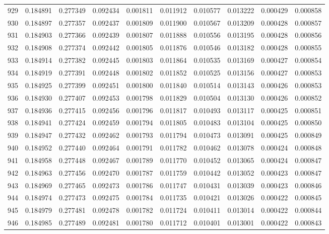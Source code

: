 \begin{tabular}{lrrrrrrrrr}
929 & 0.184891 & 0.277349 & 0.092434 & 0.001811 & 0.011912 & 0.010577 & 0.013222 & 0.000429 & 0.000858 \\
930 & 0.184897 & 0.277357 & 0.092437 & 0.001809 & 0.011900 & 0.010567 & 0.013209 & 0.000428 & 0.000857 \\
931 & 0.184903 & 0.277366 & 0.092439 & 0.001807 & 0.011888 & 0.010556 & 0.013195 & 0.000428 & 0.000856 \\
932 & 0.184908 & 0.277374 & 0.092442 & 0.001805 & 0.011876 & 0.010546 & 0.013182 & 0.000428 & 0.000855 \\
933 & 0.184914 & 0.277382 & 0.092445 & 0.001803 & 0.011864 & 0.010535 & 0.013169 & 0.000427 & 0.000854 \\
934 & 0.184919 & 0.277391 & 0.092448 & 0.001802 & 0.011852 & 0.010525 & 0.013156 & 0.000427 & 0.000853 \\
935 & 0.184925 & 0.277399 & 0.092451 & 0.001800 & 0.011840 & 0.010514 & 0.013143 & 0.000426 & 0.000853 \\
936 & 0.184930 & 0.277407 & 0.092453 & 0.001798 & 0.011829 & 0.010504 & 0.013130 & 0.000426 & 0.000852 \\
937 & 0.184936 & 0.277415 & 0.092456 & 0.001796 & 0.011817 & 0.010493 & 0.013117 & 0.000425 & 0.000851 \\
938 & 0.184941 & 0.277424 & 0.092459 & 0.001794 & 0.011805 & 0.010483 & 0.013104 & 0.000425 & 0.000850 \\
939 & 0.184947 & 0.277432 & 0.092462 & 0.001793 & 0.011794 & 0.010473 & 0.013091 & 0.000425 & 0.000849 \\
940 & 0.184952 & 0.277440 & 0.092464 & 0.001791 & 0.011782 & 0.010462 & 0.013078 & 0.000424 & 0.000848 \\
941 & 0.184958 & 0.277448 & 0.092467 & 0.001789 & 0.011770 & 0.010452 & 0.013065 & 0.000424 & 0.000847 \\
942 & 0.184963 & 0.277456 & 0.092470 & 0.001787 & 0.011759 & 0.010442 & 0.013052 & 0.000423 & 0.000847 \\
943 & 0.184969 & 0.277465 & 0.092473 & 0.001786 & 0.011747 & 0.010431 & 0.013039 & 0.000423 & 0.000846 \\
944 & 0.184974 & 0.277473 & 0.092475 & 0.001784 & 0.011735 & 0.010421 & 0.013026 & 0.000422 & 0.000845 \\
945 & 0.184979 & 0.277481 & 0.092478 & 0.001782 & 0.011724 & 0.010411 & 0.013014 & 0.000422 & 0.000844 \\
946 & 0.184985 & 0.277489 & 0.092481 & 0.001780 & 0.011712 & 0.010401 & 0.013001 & 0.000422 & 0.000843 \\

\end{tabular}
